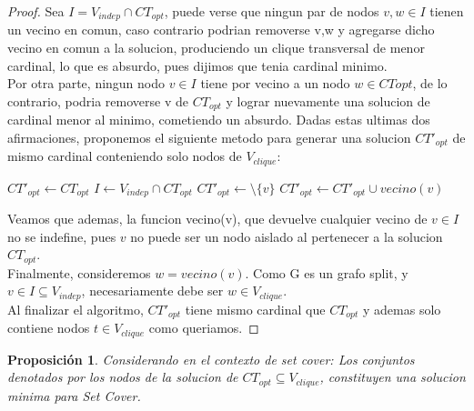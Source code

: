 \documentclass[10pt,a4paper]{article}
\newtheorem{proposition}{Proposici\'on}
\begin{document}
\begin{proof}
Sea $I = V_{indep} \cap CT_{opt}$, puede verse que ningun par de nodos $v, w \in I$ tienen un vecino en comun, caso contrario podrian removerse v,w y agregarse dicho vecino en comun a la solucion, produciendo un clique transversal de menor cardinal, lo que es absurdo, pues dijimos que tenia cardinal minimo. \\
Por otra parte, ningun nodo $v \in I$ tiene por vecino a un nodo $w \in CT{opt}$, de lo contrario, podria removerse v de $CT_{opt}$ y lograr nuevamente una solucion de cardinal menor al minimo, cometiendo un absurdo. Dadas estas ultimas dos afirmaciones, proponemos el siguiente metodo para generar una solucion $CT'_{opt}$ de mismo cardinal conteniendo solo nodos de $V_{clique}$:\\


\begin{algorithmic}
    \STATE $CT'_{opt} \gets CT_{opt}$
    \STATE $I \gets V_{indep} \cap CT_{opt}$
        \STATE $CT'_{opt} \gets \setminus \{v\}$
        \STATE $CT'_{opt} \gets CT'_{opt} \cup {vecino(v)}$
    \ENDFOR
\end{algorithmic}

Veamos que ademas, la funcion vecino(v), que devuelve cualquier vecino de $v \in I$ no se indefine, pues $v$ no puede ser un nodo aislado al pertenecer a la solucion $CT_{opt}$. \\
Finalmente, consideremos $w = vecino(v)$. Como G es un grafo split, y $v \in I \subseteq V_{indep}$, necesariamente debe ser $w \in V_{clique}$.\\
Al finalizar el algoritmo, $CT'_{opt}$ tiene mismo cardinal que $CT_{opt}$ y ademas solo contiene nodos $t \in V_{clique}$ como queriamos.
\end{proof}

\begin{proposition}
 Considerando en el contexto de set cover: Los conjuntos denotados por los nodos de la solucion de $CT_{opt} \subseteq V_{clique}$, constituyen una solucion minima para Set Cover.
\end{proposition}
\end{document}
